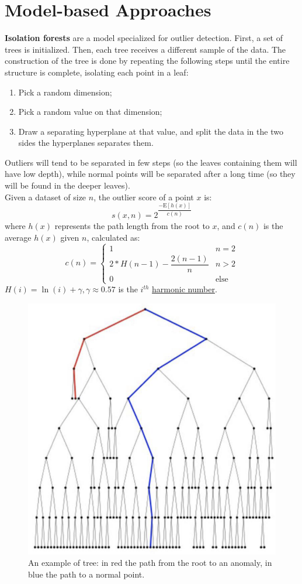 \section{Model-based Approaches}

\textbf{Isolation forests} are a model specialized for outlier detection. First, a set of trees is initialized. Then, each tree receives a different sample of the data. The construction of the tree is done by repeating the following steps until the entire structure is complete, isolating each point in a leaf:
\begin{enumerate}
    \item Pick a random dimension;
    \item Pick a random value on that dimension;
    \item Draw a separating hyperplane at that value, and split the data in the two sides the hyperplanes separates them.
\end{enumerate}
Outliers will tend to be separated in few steps (so the leaves containing them will have low depth), while normal points will be separated after a long time (so they will be found in the deeper leaves). \\
Given a dataset of size $n$, the outlier score of a point $x$ is:
\begin{equation*}
    s(x,n) = 2^{\dfrac{-\mathrm{E}[h(x)]}{c(n)}}
\end{equation*}
where $h(x)$ represents the path length from the root to $x$, and $c(n)$ is the average $h(x)$ given $n$, calculated as:
\begin{equation*}
    c(n) = \begin{cases}
        1 & n = 2 \\
        2 * H(n-1) - \dfrac{2(n-1)}{n} & n > 2 \\
        0 & \text{else}
    \end{cases}
\end{equation*}
$H(i) = \ln(i) + \gamma, \gamma \approx 0.57$ is the $i^{th}$ \hyperlink{https://en.wikipedia.org/wiki/Harmonic_number}{harmonic number}.
\begin{figure}[ht]
    \centering
    \includegraphics[width=0.35\linewidth]{img/isolation_tree.png}
    \caption{An example of tree: in red the path from the root to an anomaly, in blue the path to a normal point.}
    \label{fig:isolation-tree}
\end{figure}
